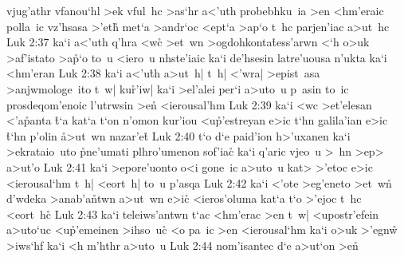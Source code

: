 vjug'athr
vfanou`hl
>ek
vful~hc
>as`hr
a<'uth
probebhku~ia
>en
<hm'eraic
polla~ic
vz'hsasa
>'eth\r{}
met`a
>andr`oc
<ept`a
>ap`o
t~hc
parjen'iac
a>ut~hc\bibvsend
\vs Luk 2:37
ka`i
a<'uth
q'hra
<w\r{c}
>et~wn
>ogdohkonta\r{t}ess'arwn
<`h
o>uk
>af'istato
>a\r{p}`o
to~u
<iero~u
nhste'iaic
ka`i
de'hsesin
latre'uousa
n'ukta
ka`i
<hm'eran\bibvsend
\vs Luk 2:38
ka`i
a<'u\r{t}h
a>ut~h|
t~h|
<'wra|
>epist~asa
>anjwmologe~ito
t~w|
ku\r{r}'iw|
ka`i
>el'alei
per`i
a>uto~u
p~asin
to~ic
prosdeqom'enoic
l'utrwsin
>e\r{n}
<ierousal'hm\bibvsend
\vs Luk 2:39
ka`i
<wc
>et'elesan
<'a\r{p}anta
\r{t}`a
kat`a
t`on
n'omon
kur'iou
<u\r{p}'estreyan
e>ic
t`hn
galila'ian
e>ic
\r{t}`hn
p'olin
\r{a}>ut~wn
nazar'e\r{t}\bibvsend
{}
\vs Luk 2:40
t`o
d`e
paid'ion
h>'uxanen
ka`i
>ekrataio~uto
\r{p}ne'umati
plhro'umenon
sof'ia\r{c}
ka`i
q'aric
vjeo~u
>~hn
>ep>
a>ut'o\bibvsend
\vs Luk 2:41
ka`i
>epore'uonto
o<i
gone~ic
a>uto~u
kat>
>'etoc
e>ic
<ierousal`hm
t~h|
<eort~h|
to~u
p'asqa\bibvsend
\vs Luk 2:42
ka`i
<'ote
>eg'eneto
>et~wn\r{}
d'wdeka
>anab'a\r{n}twn
a>ut~wn
e>ic\r{}
<ieros'oluma
kat`a
t`o
>'ejoc
t~hc
<eort~h\r{c}\bibvsend
{}
\vs Luk 2:43
ka`i
teleiws'antwn
t`ac
<hm'erac
>en
t~w|
<upostr'efein
a>uto`uc
<u\r{p}'emeinen
>ihso~uc\r{}
<o
pa~ic
>en
<ierousal`hm
ka`i
o>uk
>'egnw\r{}
>iws`hf
ka`i
<h
m'hthr
a>uto~u\bibvsend
\vs Luk 2:44
nom'isantec
d`e
a>ut`on
>en\r{}
